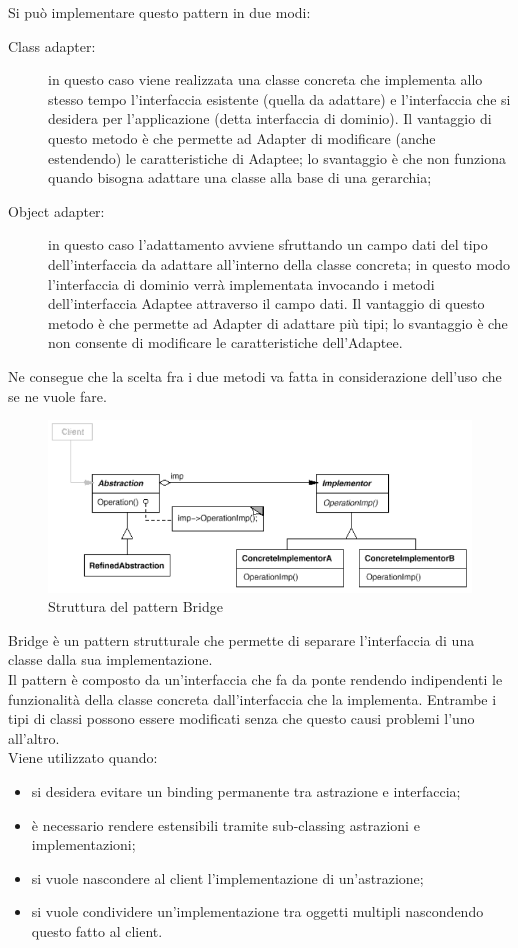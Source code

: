Si può implementare questo pattern in due modi:
\begin{description}
\item[Class adapter:] in questo caso viene realizzata una classe concreta che implementa allo stesso tempo l'interfaccia esistente (quella da adattare) e l'interfaccia che si desidera per l'applicazione (detta interfaccia di dominio). Il vantaggio di questo metodo è che permette ad Adapter di modificare (anche estendendo) le caratteristiche di Adaptee; lo svantaggio è che non funziona quando bisogna adattare una classe alla base di una gerarchia;
\item[Object adapter:] in questo caso l'adattamento avviene sfruttando un campo dati del tipo dell'interfaccia da adattare all'interno della classe concreta; in questo modo l'interfaccia di dominio verrà implementata invocando i metodi dell'interfaccia Adaptee attraverso il campo dati. Il vantaggio di questo metodo è che permette ad Adapter di adattare più tipi; lo svantaggio è che non consente di modificare le caratteristiche dell'Adaptee.
\end{description}
Ne consegue che la scelta fra i due metodi va fatta in considerazione dell'uso che se ne vuole fare.

 \label{app:bridge}
	\begin{figure}[H]\centering
    \includegraphics[scale=0.7]{SpecificaTecnica/Pics/Bridge}
    \caption{Struttura del pattern Bridge}
	\end{figure}
Bridge è un pattern strutturale che permette di separare l’interfaccia di una classe dalla sua implementazione. \\
Il pattern è composto da un’interfaccia che fa da ponte rendendo indipendenti le funzionalità della classe concreta dall’interfaccia che la implementa. Entrambe i tipi di classi possono essere modificati senza che questo causi problemi l’uno all’altro. \\
Viene utilizzato quando:
\begin{itemize}
\item si desidera evitare un binding permanente tra astrazione e interfaccia;
\item è necessario rendere estensibili tramite sub-classing astrazioni e implementazioni;
\item si vuole nascondere al client l'implementazione di un'astrazione;
\item si vuole condividere un'implementazione tra oggetti multipli nascondendo questo fatto al client.
\end{itemize}

